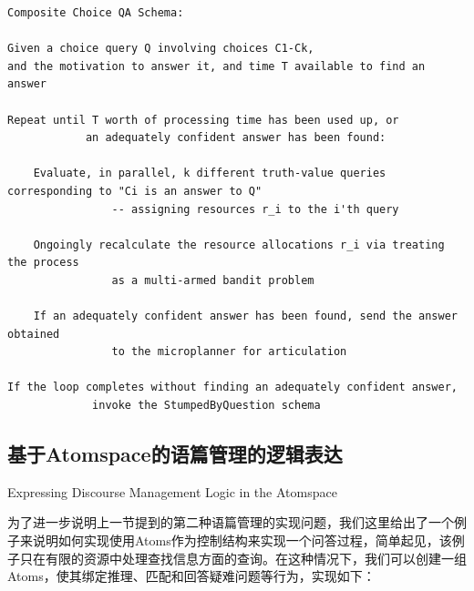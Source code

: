 \begin{verbatim}
Composite Choice QA Schema:

Given a choice query Q involving choices C1-Ck,
and the motivation to answer it, and time T available to find an answer

Repeat until T worth of processing time has been used up, or
			an adequately confident answer has been found:

 	Evaluate, in parallel, k different truth-value queries corresponding to "Ci is an answer to Q"
				-- assigning resources r_i to the i'th query
				
	Ongoingly recalculate the resource allocations r_i via treating the process
				as a multi-armed bandit problem			

	If an adequately confident answer has been found, send the answer obtained
				to the microplanner for articulation

If the loop completes without finding an adequately confident answer,
			 invoke the StumpedByQuestion schema	
\end{verbatim}	
			


\subsection{基于Atomspace的语篇管理的逻辑表达}{Expressing Discourse Management Logic in the Atomspace}


为了进一步说明上一节提到的第二种语篇管理的实现问题，我们这里给出了一个例子来说明如何实现使用Atoms作为控制结构来实现一个问答过程，简单起见，该例子只在有限的资源中处理查找信息方面的查询。在这种情况下，我们可以创建一组Atoms，使其绑定推理、匹配和回答疑难问题等行为，实现如下：


